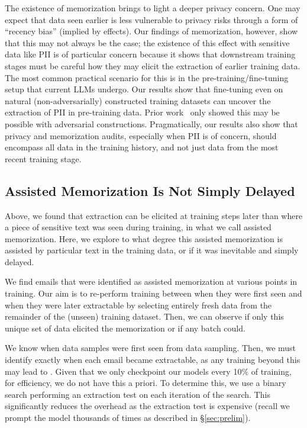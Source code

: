 The existence of \assisted memorization brings to light a deeper privacy concern. One may expect that data seen earlier is less vulnerable to privacy risks through a form of ``recency bias'' (implied by \forgetting effects). 
Our findings of \assisted memorization, however, show that this may not always be the case; the existence of this effect with sensitive data like PII is of particular concern because it shows that downstream training stages must be careful how they may elicit the extraction of earlier training data. The most common practical scenario for this is in the pre-training/fine-tuning setup that current LLMs undergo. Our results show that fine-tuning even on natural (non-adversarially) constructed training datasets can uncover the extraction of PII in pre-training data. Prior work~\citep{nasr2023scalable} only showed this may be possible with adversarial constructions. Pragmatically, our results also show that privacy and memorization audits, especially when PII is of concern, should encompass all data in the training history, and not just data from the most recent training stage.



\subsection{Assisted Memorization Is Not Simply Delayed}
\label{sec:not-delayed}
Above, we found that extraction can be elicited at training steps later than where a piece of sensitive text was seen during training, in what we call assisted memorization. Here, we explore to what degree this assisted memorization is assisted by particular text in the training data, or if it was inevitable and simply delayed.

We find emails that were identified as assisted memorization at various points in training. Our aim is to re-perform training between when they were first seen and when they were later extractable by selecting entirely fresh data from the remainder of the (unseen) training dataset. Then, we can observe if only this unique set of data elicited the memorization or if any batch could.

We know when data samples were first seen from data sampling. Then, we must identify exactly when each email became extractable, as any training beyond this may lead to \forgetting. Given that we only checkpoint our models every 10\% of training, for efficiency, we do not have this a priori. 
To determine this, we use a binary search performing an extraction test on each iteration of the search. This significantly reduces the overhead as the extraction test is expensive (recall we prompt the model thousands of times as described in \S\ref{sec:prelim}). 

